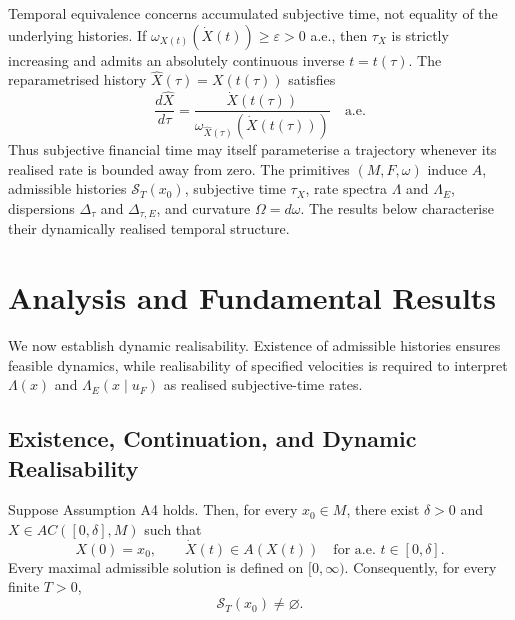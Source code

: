 \documentclass[graybox,natbib]{SNmult}
\providecommand{\1}{}
\renewcommand{\1}{\mathbbm 1}
\begin{document}
Temporal equivalence concerns accumulated subjective time, not equality of the
underlying histories. If
\(\omega_{X(t)}(\dot X(t))\geq\varepsilon>0\) a.e., then \(\tau_X\) is
strictly increasing and admits an absolutely continuous inverse \(t=t(\tau)\).
The reparametrised history \(\widehat X(\tau)=X(t(\tau))\) satisfies
\[
\frac{d\widehat X}{d\tau}
=
\frac{\dot X(t(\tau))}
{\omega_{\widehat X(\tau)}(\dot X(t(\tau)))}
\quad\text{a.e.}
\]
Thus subjective financial time may itself parameterise a trajectory whenever
its realised rate is bounded away from zero. The primitives \((M,F,\omega)\)
induce \(A\), admissible histories \(\mathcal S_T(x_0)\), subjective time
\(\tau_X\), rate spectra \(\Lambda\) and \(\Lambda_E\), dispersions
\(\Delta_\tau\) and \(\Delta_{\tau,E}\), and curvature \(\Omega=d\omega\).
The results below characterise their dynamically realised temporal structure.











\section{Analysis and Fundamental Results}
\label{sec:analysis}

We now establish dynamic realisability. Existence of admissible histories
ensures feasible dynamics, while realisability of specified velocities is
required to interpret \(\Lambda(x)\) and \(\Lambda_E(x\mid u_F)\) as realised
subjective-time rates.

\subsection{Existence, Continuation, and Dynamic Realisability}
\label{subsec:existence}

\begin{theorem}
\label{thm:existence}

Suppose Assumption A4 holds. Then, for every \(x_0\in M\), there exist
\(\delta>0\) and \(X\in AC([0,\delta],M)\) such that
\begin{equation}
X(0)=x_0,
\qquad
\dot X(t)\in A(X(t))
\quad
\text{for a.e. }t\in[0,\delta].
\label{eq:local-admissible-solution}
\end{equation}
Every maximal admissible solution is defined on \([0,\infty)\). Consequently,
for every finite \(T>0\),
\begin{equation}
\mathcal S_T(x_0)\neq\varnothing .
\label{eq:nonempty-solution-family}
\end{equation}
\end{theorem}
\end{document}
